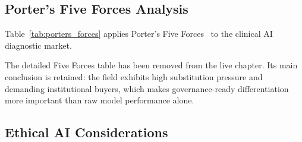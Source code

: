 %

\subsection{Porter's Five Forces Analysis}

Table~\ref{tab:porters_forces} applies Porter's Five Forces~\cite{porter2008five} to the clinical AI diagnostic market.

The detailed Five Forces table has been removed from the live chapter. Its main conclusion is retained: the field exhibits high substitution pressure and demanding institutional buyers, which makes governance-ready differentiation more important than raw model performance alone.

\subsection{Ethical AI Considerations}

